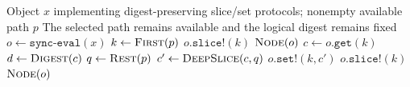 \begin{algorithm}[htbp]
\caption{Deep Slice Along Object Path}
\label{alg:deep-slice}
\begin{algorithmic}[1]
\Require Object $x$ implementing digest-preserving slice/set protocols; nonempty available path $p$
\Ensure The selected path remains available and the logical digest remains fixed
  \State $o \gets \texttt{sync-eval}(x)$
  \State $k \gets \Call{First}{p}$
    \State $o.\texttt{slice!}(k)$
    \State \Return $\Call{Node}{o}$
  \EndIf
  \State $c \gets o.\texttt{get}(k)$
  \State $d \gets \Call{Digest}{c}$
  \State $q \gets \Call{Rest}{p}$
  \State $c' \gets \Call{DeepSlice}{c,q}$
    \State {}
  \EndIf
  \State $o.\texttt{set!}(k,c')$
  \State $o.\texttt{slice!}(k)$ 
  \State \Return $\Call{Node}{o}$
\EndFunction
\end{algorithmic}
\end{algorithm}
